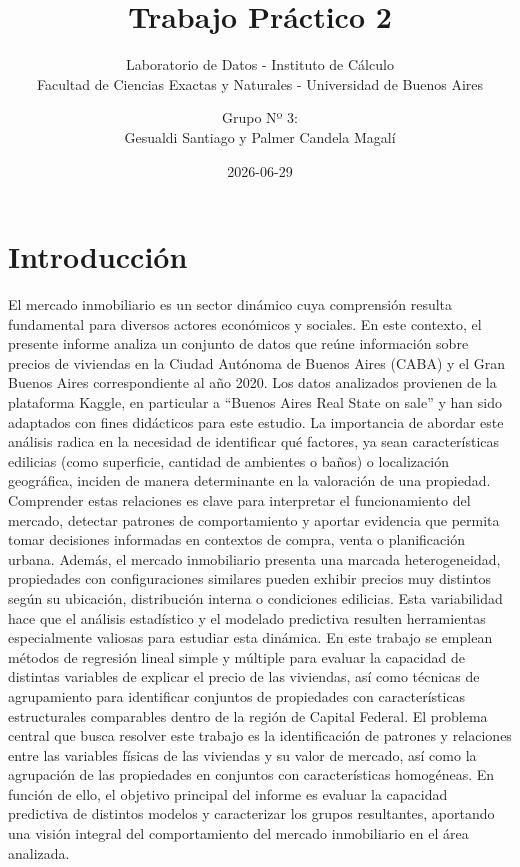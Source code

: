 \documentclass[
  spanish,
  11pt,
  titlepage]{article}
\title{\textbf{Trabajo Práctico 2}}
\subtitle{Laboratorio de Datos - Instituto de Cálculo\\
Facultad de Ciencias Exactas y Naturales - Universidad de Buenos Aires}
\author{Grupo Nº 3:\\
Gesualdi Santiago y Palmer Candela Magalí}
\date{2026-06-29}
\begin{document}
\maketitle

{
\setcounter{tocdepth}{3}
\tableofcontents
}
\newpage

\section{Introducción}\label{introducciuxf3n}

El mercado inmobiliario es un sector dinámico cuya comprensión resulta fundamental para diversos actores económicos y sociales. En este contexto, el presente informe analiza un conjunto de datos que reúne información sobre precios de viviendas en la Ciudad Autónoma de Buenos Aires (CABA) y el Gran Buenos Aires correspondiente al año 2020. Los datos analizados provienen de la plataforma Kaggle, en particular a ``Buenos Aires Real State on sale''\autocite{properati} y han sido adaptados con fines didácticos para este estudio.
La importancia de abordar este análisis radica en la necesidad de identificar qué factores, ya sean características edilicias (como superficie, cantidad de ambientes o baños) o localización geográfica, inciden de manera determinante en la valoración de una propiedad. Comprender estas relaciones es clave para interpretar el funcionamiento del mercado, detectar patrones de comportamiento y aportar evidencia que permita tomar decisiones informadas en contextos de compra, venta o planificación urbana.
Además, el mercado inmobiliario presenta una marcada heterogeneidad, propiedades con configuraciones similares pueden exhibir precios muy distintos según su ubicación, distribución interna o condiciones edilicias. Esta variabilidad hace que el análisis estadístico y el modelado predictiva resulten herramientas especialmente valiosas para estudiar esta dinámica. En este trabajo se emplean métodos de regresión lineal simple y múltiple para evaluar la capacidad de distintas variables de explicar el precio de las viviendas, así como técnicas de agrupamiento para identificar conjuntos de propiedades con características estructurales comparables dentro de la región de Capital Federal.
El problema central que busca resolver este trabajo es la identificación de patrones y relaciones entre las variables físicas de las viviendas y su valor de mercado, así como la agrupación de las propiedades en conjuntos con características homogéneas. En función de ello, el objetivo principal del informe es evaluar la capacidad predictiva de distintos modelos y caracterizar los grupos resultantes, aportando una visión integral del comportamiento del mercado inmobiliario en el área analizada.
\end{document}
